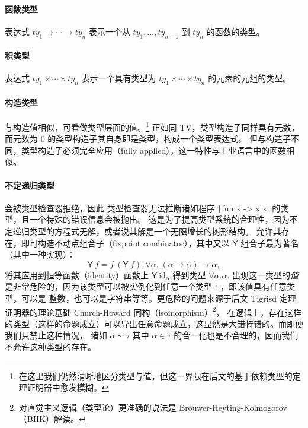 {\setlength{\parskip}{-1em}
  \paragraph*{函数类型}
  表达式 \(ty_1\to\cdots\to ty_n\) 表示一个从 \(ty_1,\dots,ty_{n-1}\) 到 \(ty_n\) 的函数的类型。
  \paragraph*{积类型}
  表达式 \(ty_1\times\cdots\times ty_n\) 表示一个具有类型为 \(ty_1\times\cdots\times ty_n\) 的元素的元组的类型。
  \paragraph*{构造类型} 与构造值相似，可看做类型层面的值。\footnote{在这里我们仍然清晰地区分类型与值，但这一界限在后文的基于依赖类型的定理证明器中愈发模糊。}
  正如同 TV，类型构造子同样具有元数，而元数为 0 的类型构造子其自身即是类型，构成一个类型表达式。
  但与构造子不同，类型构造子必须完全应用（fully applied），这一特性与工业语言中的函数相似。
  \paragraph*{不定递归类型}\label{para:equirecursive} 会被类型检查器拒绝，因此
  类型检查器无法推断诸如程序 \texttt|fun x -> x x| 的类型，且一个特殊的错误信息会被抛出。
  这是为了提高类型系统的合理性，因为不定递归类型的方程式无解，或者说其解是一个无限增长的树形结构。
  允许其存在，即可构造不动点组合子（fixpoint combinator），其中又以 $\mathsf{Y}$ 组合子最为著名（其中一种实现）：
  \begin{equation}
    \mathsf{Y}\ f = f\ (\mathsf{Y}\ f) : \forall \alpha.\;(\alpha\to\alpha)\to\alpha,
  \end{equation}
  将其应用到恒等函数（identity）函数上 $\mathsf{Y}\ \mathrm{id}_\alpha$ 得到类型 $\forall \alpha. \alpha$.
  出现这一类型的\emph{值}是非常危险的，因为该类型可以被实例化到任意一个类型上，即该值具有任意类型，可以是
  整数，也可以是字符串等等。更危险的问题来源于后文 Tigrisd 定理证明器的理论基础 Church-Howard 同构（isomorphism）\footnote{对直觉主义逻辑（类型论）更准确的说法是 Brouwer-Heyting-Kolmogorov（BHK）解读。}，
  在逻辑上，存在这样的类型（这样的命题成立）可以导出任意命题成立，这显然是大错特错的。而即便我们只禁止这种情况，
  诸如 $\alpha\sim\tau$ 其中 $\alpha\in\tau$ 的合一化也是不合理的，因而我们不允许这种类型的存在。
}

